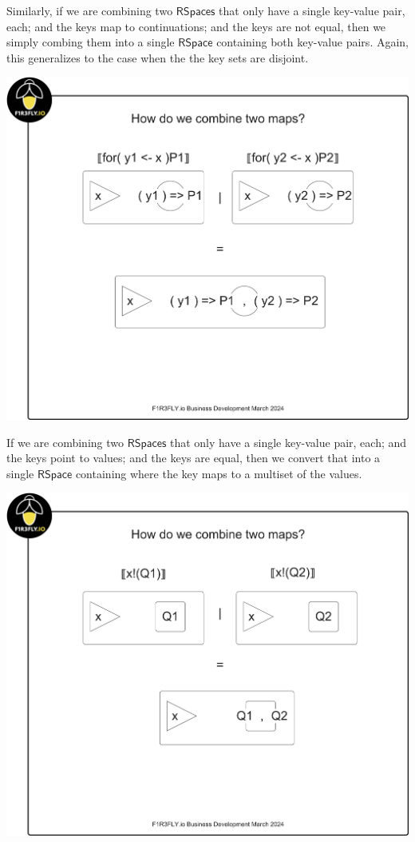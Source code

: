 Similarly, if we are combining two $\mathsf{RSpaces}$ that only have a
single key-value pair, each; and the keys map to continuations; and
the keys are not equal, then we simply combing them into a single
$\mathsf{RSpace}$ containing both key-value pairs. Again, this
generalizes to the case when the the key sets are disjoint.

\includegraphics[scale=0.25]{RHO20RSpaceSlide4.pdf}

If we are combining two $\mathsf{RSpaces}$ that only have a single
key-value pair, each; and the keys point to values; and the
keys are equal, then we convert that into a single $\mathsf{RSpace}$
containing where the key maps to a multiset of the values. 

\includegraphics[scale=0.25]{RHO20RSpaceSlide5.pdf}


